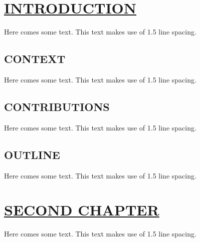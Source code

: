 \documentclass{article}
\begin{document}
{{{{{{{\pagebreak
{}
\section{\uline{INTRODUCTION}}
Here comes some text. This text makes use of 1.5 line spacing. 
\subsection{CONTEXT}
Here comes some text. This text makes use of 1.5 line spacing. 
\subsection{CONTRIBUTIONS}
Here comes some text. This text makes use of 1.5 line spacing. 
\subsection{OUTLINE}
Here comes some text. This text makes use of 1.5 line spacing. 
\pagebreak
\section{\uline{SECOND CHAPTER}}
Here comes some text. This text makes use of 1.5 line spacing. 
}}}}}}}
\end{document}
